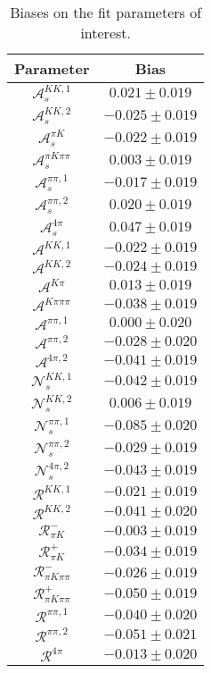 \begin{table}
  \centering
  \small
  \begin{tabular}{cc}
  \toprule
      Parameter & Bias \\
  \midrule
      $\mathcal{A}_s^{KK,1}$ & $0.021 \pm 0.019$ \\
      $\mathcal{A}_s^{KK,2}$ & $-0.025 \pm 0.019$ \\
      $\mathcal{A}_s^{\pi K}$ & $-0.022 \pm 0.019$ \\
      $\mathcal{A}_s^{\pi K\pi\pi}$ & $0.003 \pm 0.019$ \\
      $\mathcal{A}_s^{\pi\pi,1}$ & $-0.017 \pm 0.019$ \\
      $\mathcal{A}_s^{\pi\pi,2}$ & $0.020 \pm 0.019$ \\
      $\mathcal{A}_s^{4\pi}$ & $0.047 \pm 0.019$ \\
      $\mathcal{A}^{KK,1}$ & $-0.022 \pm 0.019$ \\
      $\mathcal{A}^{KK,2}$ & $-0.024 \pm 0.019$ \\
      $\mathcal{A}^{K\pi}$ & $0.013 \pm 0.019$ \\
      $\mathcal{A}^{K\pi\pi\pi}$ & $-0.038 \pm 0.019$ \\
      $\mathcal{A}^{\pi\pi,1}$ & $0.000 \pm 0.020$ \\
      $\mathcal{A}^{\pi\pi,2}$ & $-0.028 \pm 0.020$ \\
      $\mathcal{A}^{4\pi,2}$ & $-0.041 \pm 0.019$ \\
      $\mathcal{N}_s^{KK,1}$ & $-0.042 \pm 0.019$ \\
      $\mathcal{N}_s^{KK,2}$ & $0.006 \pm 0.019$ \\
      $\mathcal{N}_s^{\pi\pi,1}$ & $-0.085 \pm 0.020$ \\
      $\mathcal{N}_s^{\pi\pi,2}$ & $-0.029 \pm 0.019$ \\
      $\mathcal{N}_s^{4\pi,2}$ & $-0.043 \pm 0.019$ \\
      $\mathcal{R}^{KK,1}$ & $-0.021 \pm 0.019$ \\
      $\mathcal{R}^{KK,2}$ & $-0.041 \pm 0.020$ \\
      $\mathcal{R}_{\pi K}^-$ & $-0.003 \pm 0.019$ \\
      $\mathcal{R}_{\pi K}^+$ & $-0.034 \pm 0.019$ \\
      $\mathcal{R}_{\pi K\pi\pi}^-$ & $-0.026 \pm 0.019$ \\
      $\mathcal{R}_{\pi K\pi\pi}^+$ & $-0.050 \pm 0.019$ \\
      $\mathcal{R}^{\pi\pi,1}$ & $-0.040 \pm 0.020$ \\
      $\mathcal{R}^{\pi\pi,2}$ & $-0.051 \pm 0.021$ \\
      $\mathcal{R}^{4\pi}$ & $-0.013 \pm 0.020$ \\
      \bottomrule
  \end{tabular}
  \caption{Biases on the fit parameters of interest.}
\label{tab:biases}
\end{table}
